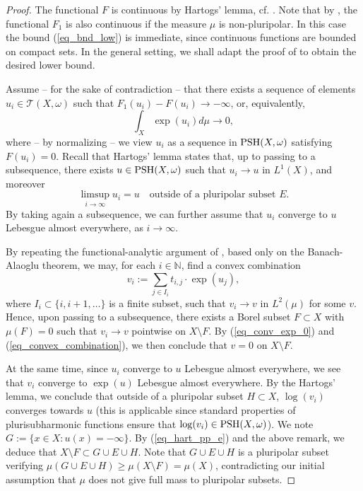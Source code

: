 \documentclass[12pt]{article}
\numberwithin{equation}{section}
\theoremstyle{theorem}
\theoremstyle{definition}
\theoremstyle{remark}
\newcommand{\nat}{\mathbb{N}}
\begin{document}
\begin{proof}
		The functional $F$ is continuous by Hartogs' lemma, cf. \cite[Theorem 1.46]{GuedjZeriahBook}.
		Note that by \cite[Lemma 1.14]{BerBoucNys}, the functional $F_1$ is also continuous if the measure $\mu$ is non-pluripolar.
		In this case the bound (\ref{eq_bnd_low}) is immediate, since continuous functions are bounded on compact sets.
		In the general setting, we shall adapt the proof of \cite[Lemma 1.14]{BerBoucNys} to obtain the desired lower bound.
		\par 
		Assume -- for the sake of contradiction -- that there exists a sequence of elements $u_i \in \mathcal{T}(X,\omega)$ such that $F_1(u_i) - F(u_i) \to -\infty$, or, equivalently, 
		\begin{equation}\label{eq_conv_exp_0}
			\int_X \exp(u_i) d\mu \to 0,
		\end{equation}
		where -- by normalizing -- we view $u_i$ as a sequence in ${\rm{PSH}}(X, \omega)$ satisfying $F(u_i)=0$.  
		Recall that Hartogs' lemma states that, up to passing to a subsequence, there exists $u \in {\rm PSH}(X,\omega)$ such that $u_i \to u$ in $L^1(X)$, and moreover 
		\begin{equation}\label{eq_hart_pp_e}
			\limsup_{i \to \infty} u_i = u \quad \text{outside of a pluripolar subset } E.
		\end{equation}
		By taking again a subsequence, we can further assume that $u_i$ converge to $u$ Lebesgue almost everywhere, as $i \to \infty$.
		\par 
		By repeating the functional-analytic argument of \cite[Lemma 1.14]{BerBoucNys}, based only on the Banach-Alaoglu theorem, we may, for each $i \in \nat$, find a convex combination
		\begin{equation}\label{eq_convex_combination}
    		v_i := \sum_{j \in I_i} t_{i,j} \cdot \exp(u_j),
		\end{equation}
		where $I_i \subset \{i, i+1, \ldots\}$ is a finite subset, such that $v_i \to v$ in $L^2(\mu)$ for some $v$.  
		Hence, upon passing to a subsequence, there exists a Borel subset $F \subset X$ with $\mu(F)=0$ 
such that $v_i \to v$ pointwise on $X \setminus F$.
		By (\ref{eq_conv_exp_0}) and (\ref{eq_convex_combination}), we then conclude that $v = 0$ on $X \setminus F$.
		\par 
		At the same time, since $u_i$ converge to $u$ Lebesgue almost everywhere, we see that $v_i$ converge to $\exp(u)$ Lebesgue almost everywhere.
		By the Hartogs' lemma, we conclude that outside of a pluripolar subset $H \subset X$, $\log(v_i)$ converges towards $u$ (this is applicable since standard properties of plurisubharmonic functions ensure that $\log(v_i) \in {\rm{PSH}}(X, \omega)$). 
		We note $G := \{ x \in X : u(x) = - \infty \}$.
		By (\ref{eq_hart_pp_e}) and the above remark, we deduce that $X \setminus F \subset G \cup E \cup H$.
		Note that $G \cup E \cup H$ is a pluripolar subset verifying $\mu(G \cup E \cup H) \geq \mu(X \setminus F) = \mu(X)$, contradicting our initial assumption that $\mu$ does not give full mass to pluripolar subsets.
	\end{proof}
\end{document}
